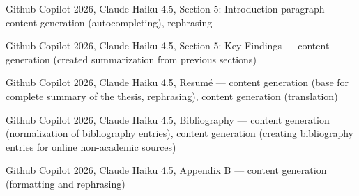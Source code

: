 \begin{trivlist}
\item Github Copilot 2026, Claude Haiku 4.5, Section 5: Introduction paragraph ---
    content generation (autocompleting), rephrasing

\item Github Copilot 2026, Claude Haiku 4.5, Section 5: Key Findings ---
    content generation (created summarization from previous sections)

\item Github Copilot 2026, Claude Haiku 4.5, Resum\'{e} ---
    content generation (base for complete summary of the thesis, rephrasing),
    content generation (translation)

\item Github Copilot 2026, Claude Haiku 4.5, Bibliography ---
    content generation (normalization of bibliography entries),
    content generation (creating bibliography entries for online non-academic
    sources)

\item Github Copilot 2026, Claude Haiku 4.5, Appendix B ---
    content generation (formatting and rephrasing)

\end{trivlist}
